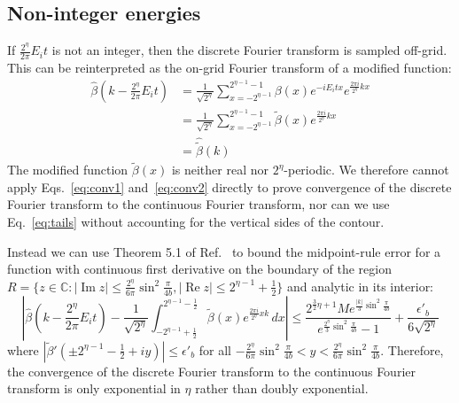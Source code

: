 \documentclass[aps,floatfix,10pt,amssymb,amsfont,amsmath,superscriptaddress,float,nofootinbib,longbibliography,nobalancelastpage,twocolumn]{revtex4-2}
\begin{document}
\subsection{Non-integer energies}
\label{section:noninteger}
If $\frac{2^{\eta}}{2\pi}E_it$ is not an integer, then the discrete Fourier transform is sampled off-grid. This can be reinterpreted as the on-grid Fourier transform of a modified function:
\begin{align}
    \hat \beta(k -\frac{2^{\eta}}{2\pi}E_it) &= \frac{1}{\sqrt{2^{\eta}}} \sum_{x=-2^{\eta-1}}^{2^{\eta-1}-1} \beta(x) e^{-iE_it x}e^{\frac{2\pi i}{2^{\eta}} kx}\\
    &= \frac{1}{\sqrt{2^{\eta}}} \sum_{x=-2^{\eta-1}}^{2^{\eta-1}-1} \tilde\beta(x)e^{\frac{2\pi i}{2^{\eta}} kx}\\
    &= \hat{\tilde\beta}(k)
\end{align}
The modified function $\tilde\beta(x)$ is neither real nor $2^{\eta}$-periodic. We therefore cannot apply Eqs.~\eqref{eq:conv1} and~\eqref{eq:conv2} directly to prove convergence of the discrete Fourier transform to the continuous Fourier transform, nor can we use Eq.~\eqref{eq:tails} without accounting for the vertical sides of the contour.

Instead we can use Theorem 5.1 of Ref.~\cite{javed2014trapezoidal} to bound the midpoint-rule error for a function with continuous first derivative on the boundary of the region $R = \{z \in \mathbb{C}: |\operatorname{Im} z| \leq  \frac{2^{\eta}}{6\pi}\sin^2\frac{\pi}{4b}, |\operatorname{Re} z| \leq 2^{\eta-1}+\frac{1}{2}\}$ and analytic in its interior:
\begin{equation}
    \left| \hat \beta\!\left(k-\frac{2^{\eta}}{2\pi}E_it\right) - \frac{1}{\sqrt{2^{\eta}}} \int_{-2^{\eta-1}+\frac{1}{2}}^{2^{\eta-1}-\frac{1}{2}}\tilde\beta(x)e^{\frac{2\pi i}{2^{\eta}}xk}\,dx \right| \leq \frac{2^{\frac{3}{2}\eta+1} Me^{\frac{|k|}{3}\sin^2 \frac{\pi}{4b}}}{e^{\frac{2^{\eta}}{3}\sin^2 \frac{\pi}{4b}}-1} + \frac{\epsilon'_{b}}{6\sqrt{2^{\eta}}}
\end{equation}
where $|\tilde\beta'(\pm2^{\eta-1}-\frac{1}{2}+iy)| \leq \epsilon'_{b}$ for all $-\frac{2^{\eta}}{6\pi}\sin^2\frac{\pi}{4b}<y<\frac{2^{\eta}}{6\pi}\sin^2\frac{\pi}{4b}$. Therefore, the convergence of the discrete Fourier transform to the continuous Fourier transform is only exponential in $\eta$ rather than doubly exponential.
\end{document}
